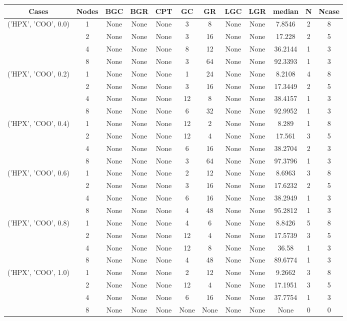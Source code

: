 \begin{tabular}{cccccccccccc}
\hline
Cases & Nodes& BGC& BGR& CPT& GC& GR& LGC& LGR& median & N & Ncase \\
\hline
\multirow{4}{*}{('HPX', 'COO', 0.0)}& 1& None& None& None& 3& 8& None& None& 7.8546& 2& 8\\
& 2& None& None& None& 3& 16& None& None& 17.228& 2& 5\\
& 4& None& None& None& 8& 12& None& None& 36.2144& 1& 3\\
& 8& None& None& None& 3& 64& None& None& 92.3393& 1& 3\\
\hline
\multirow{4}{*}{('HPX', 'COO', 0.2)}& 1& None& None& None& 1& 24& None& None& 8.2108& 4& 8\\
& 2& None& None& None& 3& 16& None& None& 17.3449& 2& 5\\
& 4& None& None& None& 12& 8& None& None& 38.4157& 1& 3\\
& 8& None& None& None& 6& 32& None& None& 92.9952& 1& 3\\
\hline
\multirow{4}{*}{('HPX', 'COO', 0.4)}& 1& None& None& None& 12& 2& None& None& 8.289& 1& 8\\
& 2& None& None& None& 12& 4& None& None& 17.561& 3& 5\\
& 4& None& None& None& 6& 16& None& None& 38.2704& 2& 3\\
& 8& None& None& None& 3& 64& None& None& 97.3796& 1& 3\\
\hline
\multirow{4}{*}{('HPX', 'COO', 0.6)}& 1& None& None& None& 2& 12& None& None& 8.6963& 3& 8\\
& 2& None& None& None& 3& 16& None& None& 17.6232& 2& 5\\
& 4& None& None& None& 6& 16& None& None& 38.2949& 1& 3\\
& 8& None& None& None& 4& 48& None& None& 95.2812& 1& 3\\
\hline
\multirow{4}{*}{('HPX', 'COO', 0.8)}& 1& None& None& None& 4& 6& None& None& 8.8426& 5& 8\\
& 2& None& None& None& 12& 4& None& None& 17.5739& 3& 5\\
& 4& None& None& None& 12& 8& None& None& 36.58& 1& 3\\
& 8& None& None& None& 4& 48& None& None& 89.6774& 1& 3\\
\hline
\multirow{4}{*}{('HPX', 'COO', 1.0)}& 1& None& None& None& 2& 12& None& None& 9.2662& 3& 8\\
& 2& None& None& None& 12& 4& None& None& 17.1951& 3& 5\\
& 4& None& None& None& 6& 16& None& None& 37.7754& 1& 3\\
& 8& None& None& None& None& None& None& None& None& 0& 0\\
\hline
\end{tabular}



